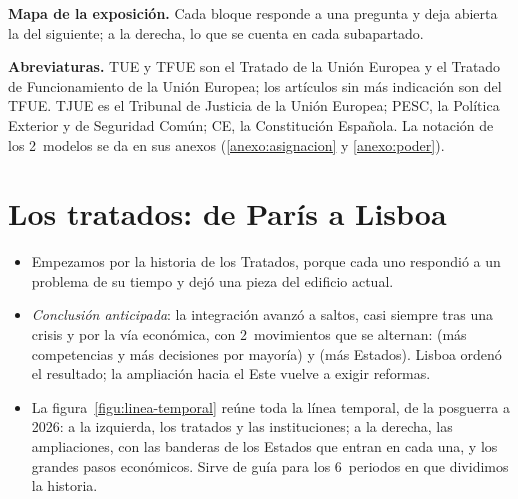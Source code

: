 \documentclass[11pt]{article}
\begin{document}
\begin{anotaciones}
\textbf{Mapa de la exposición.} Cada bloque responde a una pregunta y deja abierta la del siguiente; a la derecha, lo que se cuenta en cada subapartado.
\begin{infografiacaja}
\caption{Mapa del tema: la pregunta de cada bloque y el hilo que los une}\label{figu:mapa-tema}
\end{infografiacaja}
\end{anotaciones}


\begin{anotaciones}
\textbf{Abreviaturas.} TUE y TFUE son el Tratado de la Unión Europea y el Tratado de Funcionamiento de la Unión Europea; los artículos sin más indicación son del TFUE. TJUE es el Tribunal de Justicia de la Unión Europea; PESC, la Política Exterior y de Seguridad Común; CE, la Constitución Española. La notación de los 2~modelos se da en sus anexos (\ref{anexo:asignacion} y \ref{anexo:poder}).
\end{anotaciones}

\section{Los tratados: de París a Lisboa}\label{sec:tratados}

\begin{itemize}
\item Empezamos por la historia de los Tratados, porque cada uno respondió a un problema de su tiempo y dejó una pieza del edificio actual.
\item \emph{Conclusión anticipada}: la integración avanzó a saltos, casi siempre tras una crisis y por la vía económica, con 2~movimientos que se alternan:  (más competencias y más decisiones por mayoría) y  (más Estados). Lisboa ordenó el resultado; la ampliación hacia el Este vuelve a exigir reformas.
\item La figura~\ref{figu:linea-temporal} reúne toda la línea temporal, de la posguerra a 2026: a la izquierda, los tratados y las instituciones; a la derecha, las ampliaciones, con las banderas de los Estados que entran en cada una, y los grandes pasos económicos. Sirve de guía para los 6~periodos en que dividimos la historia.
\end{itemize}

\begin{infografia}[p]
\centering
\caption{La línea temporal de la integración europea, 1945-2026}\label{figu:linea-temporal}
\end{infografia}
\end{document}
